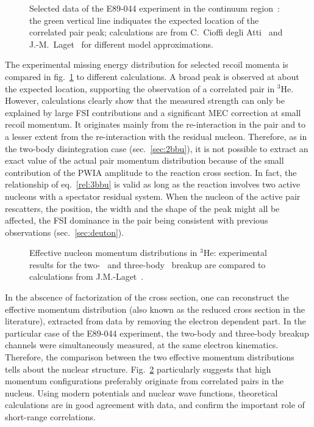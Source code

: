 \documentclass{elsart}
\begin{document}
\begin{figure}[ht]
\begin{center}
\caption{Selected data of the E89-044 experiment in the continuum
region~\cite{Ben04}: the green vertical line indiquates the expected location 
of the correlated pair peak; calculations are from C.~Cioffi degli Atti~\cite{Cio04} 
and J.-M.~Laget~\cite{Lag04} for different model approximations.}
\label{3bbu}
\end{center}
\end{figure}
The experimental missing energy distribution for selected recoil momenta is
compared in fig.~\ref{3bbu} to different calculations. A broad peak is 
observed at about the expected location, supporting the observation of a 
correlated pair in $^3$He. However, calculations clearly show that the measured 
strength can only be explained by large FSI contributions and a significant MEC 
correction at small recoil momentum. It originates mainly from the 
re-interaction in the pair and to a lesser extent from the re-interaction with 
the residual nucleon. Therefore, as in the two-body disintegration case 
(sec.~\ref{sec:2bbu}), it is 
not possible to extract an exact value of the actual pair momentum distribution 
because of the small contribution of the PWIA amplitude to the 
reaction cross section. In fact, the relationship of eq.~\ref{rel:3bbu} is 
valid as long as the reaction involves two active nucleons with a spectator 
residual system. When the nucleon of the active pair rescatters, the position,
the width and the shape of the peak might all be affected, the FSI dominance in 
the pair being consistent with previous observations (sec.~\ref{sec:deuton}).

\begin{figure}[ht]
\begin{center}
\caption{Effective nucleon momentum distributions in $^3$He: experimental 
results for the two-~\cite{Rva03} and three-body~\cite{BenTh} breakup are 
compared to calculations from J.M.-Laget~\cite{Lag04}.}
\label{effdens}
\end{center}
\end{figure}
In the abscence of factorization of the cross section, one can 
reconstruct the effective momentum distribution (also known as the reduced 
cross section in the literature), extracted from data by removing the electron 
dependent part. In the particular case of the E89-044 experiment, the two-body 
and three-body breakup channels were simultaneously measured, at the same
electron kinematics. Therefore, the comparison between the two effective
momentum distributions tells about the nuclear structure. Fig.~\ref{effdens} 
particularly suggests that high momentum configurations preferably originate 
from correlated pairs in the nucleus. Using modern potentials and nuclear 
wave functions, theoretical calculations are in good agreement with data, 
and confirm the important role of short-range correlations. 
  
\end{document}
